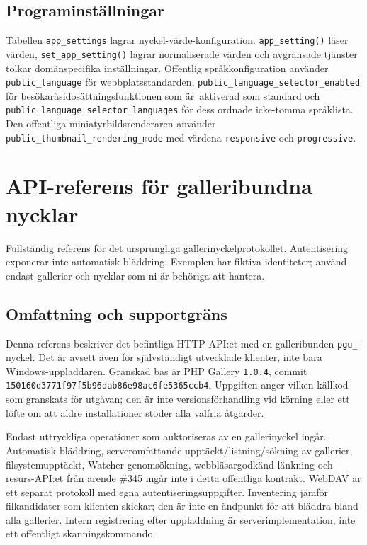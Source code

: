\documentclass[11pt,a4paper]{article}
\newcommand{\setting}[1]{\nolinkurl{#1}}
\newcommand{\codeword}[1]{\nolinkurl{#1}}
\begin{document}
\subsection{Programinställningar}

Tabellen \codeword{app_settings} lagrar nyckel-värde-konfiguration.
\codeword{app_setting()} läser värden, \codeword{set_app_setting()} lagrar
normaliserade värden och avgränsade tjänster tolkar domänspecifika
inställningar. Offentlig språkkonfiguration använder \setting{public_language}
för webbplatsstandarden, \setting{public_language_selector_enabled} för
besökaråsidosättningsfunktionen som är~aktiverad som standard och
\setting{public_language_selector_languages} för dess ordnade icke-tomma
språklista. Den offentliga miniatyrbildsrenderaren använder
\setting{public_thumbnail_rendering_mode} med värdena \setting{responsive} och
\setting{progressive}.



\section{API-referens för galleribundna nycklar}

\label{sec:gallery-key-api}


Fullständig referens för det ursprungliga gallerinyckelprotokollet. Autentisering exponerar
inte automatisk bläddring. Exemplen har fiktiva identiteter; använd endast gallerier och
nycklar som ni är behöriga att hantera.

\subsection{\texorpdfstring{Omfattning och supportgräns}{Omfattning och supportgräns}}

\label{api352:scope}

Denna referens beskriver det befintliga HTTP-API:et med en galleribunden
\codeword{pgu_}-nyckel. Det är avsett även för självständigt utvecklade klienter, inte bara
Windows-uppladdaren. Granskad bas är PHP Gallery \codeword{1.0.4}, commit
\codeword{150160d3771f97f5b96dab86e98ac6fe5365ccb4}. Uppgiften anger vilken källkod som
granskats för utgåvan; den är inte versionsförhandling vid körning eller ett löfte om att
äldre installationer stöder alla valfria åtgärder.

Endast uttryckliga operationer som auktoriseras av en gallerinyckel ingår. Automatisk
bläddring, serveromfattande upptäckt/listning/sökning av gallerier, filsystemupptäckt,
Watcher-genomsökning, webbläsargodkänd länkning och resurs-API:et från ärende \#345 ingår
inte i detta offentliga kontrakt. WebDAV är ett separat protokoll med egna
autentiseringsuppgifter. Inventering jämför filkandidater som klienten skickar; den är inte
en ändpunkt för att bläddra bland alla gallerier. Intern registrering efter uppladdning är
serverimplementation, inte ett offentligt skanningskommando.
\end{document}
